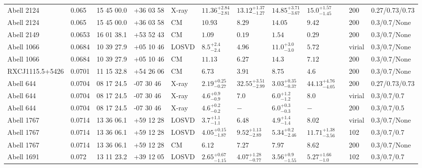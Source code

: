 \begin{landscape}
\begin{center}
{\begin{longtable}{llllllllllll}
Abell 2124 & 0.065 & 15 45 00.0 & +36 03 58 & X-ray & ${11.36}^{+2.84}_{-2.81}$ & ${13.12}^{+1.37}_{-1.27}$ & ${14.85}^{+3.71}_{-3.67}$ & ${15.0}^{+1.57}_{-1.45}$ & \citet{BA14.1} & 200 & 0.27/0.73/0.73 \\
Abell 2124 & 0.065 & 15 45 00.0 & +36 03 58 & CM & ${10.93}^{}_{}$ & ${8.29}^{}_{}$ & ${14.05}^{}_{}$ & ${9.42}^{}_{}$ & \citet{RI06.1} & 200 & 0.3/0.7/None \\
Abell 2149 & 0.0653 & 16 01 38.1 & +53 52 43 & CM & ${1.09}^{}_{}$ & ${0.19}^{}_{}$ & ${1.54}^{}_{}$ & ${0.29}^{}_{}$ & \citet{RI06.1} & 200 & 0.3/0.7/None \\
Abell 1066 & 0.0684 & 10 39 27.9 & +05 10 46 & LOSVD & ${8.5}^{+2.4}_{-2.4}$ & ${4.96}^{}_{}$ & ${11.0}^{+3.0}_{-3.0}$ & ${5.72}^{}_{}$ & \citet{AB11.1} & virial & 0.3/0.7/None \\
Abell 1066 & 0.0684 & 10 39 27.9 & +05 10 46 & CM & ${11.13}^{}_{}$ & ${6.27}^{}_{}$ & ${14.3}^{}_{}$ & ${7.12}^{}_{}$ & \citet{RI06.1} & 200 & 0.3/0.7/None \\
RXCJ1115.5+5426 & 0.0701 & 11 15 32.8 & +54 26 06 & CM & ${6.73}^{}_{}$ & ${3.91}^{}_{}$ & ${8.75}^{}_{}$ & ${4.6}^{}_{}$ & \citet{RI06.1} & 200 & 0.3/0.7/None \\
Abell 644 & 0.0704 & 08 17 24.5 & -07 30 46 & X-ray & ${2.19}^{+0.25}_{-0.27}$ & ${32.55}^{+3.51}_{-2.99}$ & ${3.03}^{+0.35}_{-0.37}$ & ${44.13}^{+4.76}_{-4.05}$ & \citet{BA14.1} & 200 & 0.27/0.73/0.73 \\
Abell 644 & 0.0704 & 08 17 24.5 & -07 30 46 & X-ray & ${4.6}^{+0.9}_{-0.9}$ & ${7.0}^{}_{}$ & ${6.0}^{+1.2}_{-1.2}$ & ${8.0}^{}_{}$ & \citet{BU05.1} & virial & 0.3/0.7/0.7 \\
Abell 644 & 0.0704 & 08 17 24.5 & -07 30 46 & X-ray & ${4.6}^{+0.2}_{-0.2}$ & ${-}^{}_{}$ & ${6.0}^{+0.3}_{-0.3}$ & ${-}^{}_{}$ & \citet{XU01.1} & 200 & 0.3/0.7/0.5 \\
Abell 1767 & 0.0714 & 13 36 06.1 & +59 12 28 & LOSVD & ${3.7}^{+1.1}_{-1.1}$ & ${6.48}^{}_{}$ & ${4.9}^{+1.4}_{-1.4}$ & ${8.02}^{}_{}$ & \citet{AB11.1} & virial & 0.3/0.7/None \\
Abell 1767 & 0.0714 & 13 36 06.1 & +59 12 28 & LOSVD & ${4.05}^{+0.15}_{-1.87}$ & ${9.52}^{+1.13}_{-2.89}$ & ${5.34}^{+0.2}_{-2.46}$ & ${11.71}^{+1.38}_{-3.56}$ & \citet{WO10.1} & 102 & 0.3/0.7/0.7 \\
Abell 1767 & 0.0714 & 13 36 06.1 & +59 12 28 & CM & ${6.12}^{}_{}$ & ${7.27}^{}_{}$ & ${7.97}^{}_{}$ & ${8.62}^{}_{}$ & \citet{RI06.1} & 200 & 0.3/0.7/None \\
Abell 1691 & 0.072 & 13 11 23.2 & +39 12 05 & LOSVD & ${2.65}^{+0.67}_{-1.15}$ & ${4.07}^{+1.28}_{-0.77}$ & ${3.56}^{+0.9}_{-1.55}$ & ${5.27}^{+1.66}_{-1.0}$ & \citet{WO10.1} & 102 & 0.3/0.7/0.7 \\

\end{longtable}}
\end{center}
\end{landscape}
